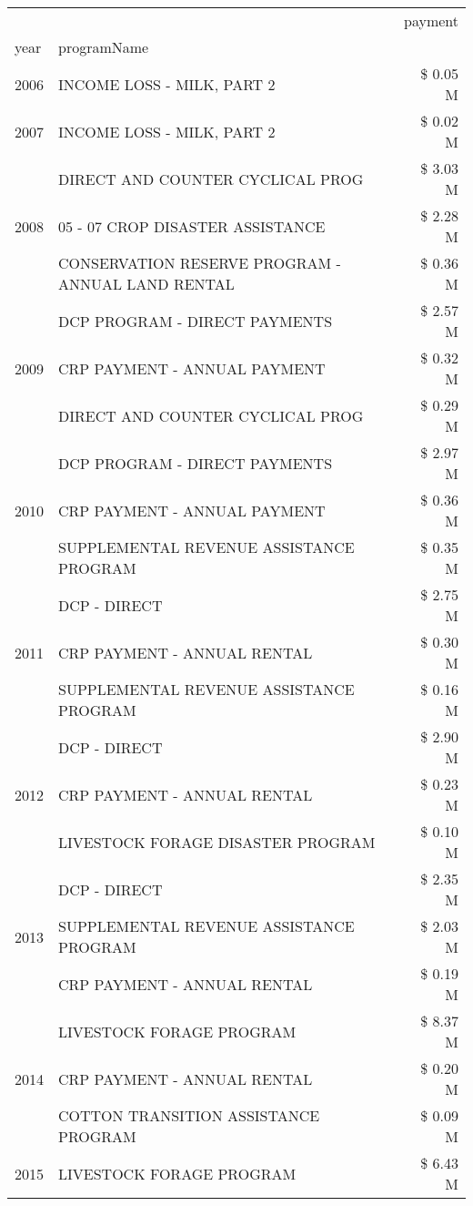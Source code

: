 \begin{tabular}{llr}
\toprule
 &  & payment \\
year & programName &  \\
\midrule
2006 & INCOME LOSS - MILK, PART 2 & \$ 0.05 M \\
\cline{1-3}
2007 & INCOME LOSS - MILK, PART 2 & \$ 0.02 M \\
\cline{1-3}
\multirow[t]{3}{*}{2008} & DIRECT AND COUNTER CYCLICAL PROG & \$ 3.03 M \\
 & 05 - 07 CROP DISASTER ASSISTANCE & \$ 2.28 M \\
 & CONSERVATION RESERVE PROGRAM - ANNUAL LAND RENTAL & \$ 0.36 M \\
\cline{1-3}
\multirow[t]{3}{*}{2009} & DCP PROGRAM - DIRECT PAYMENTS & \$ 2.57 M \\
 & CRP PAYMENT - ANNUAL PAYMENT & \$ 0.32 M \\
 & DIRECT AND COUNTER CYCLICAL PROG & \$ 0.29 M \\
\cline{1-3}
\multirow[t]{3}{*}{2010} & DCP PROGRAM - DIRECT PAYMENTS & \$ 2.97 M \\
 & CRP PAYMENT - ANNUAL PAYMENT & \$ 0.36 M \\
 & SUPPLEMENTAL REVENUE ASSISTANCE PROGRAM & \$ 0.35 M \\
\cline{1-3}
\multirow[t]{3}{*}{2011} & DCP - DIRECT & \$ 2.75 M \\
 & CRP PAYMENT - ANNUAL RENTAL & \$ 0.30 M \\
 & SUPPLEMENTAL REVENUE ASSISTANCE PROGRAM & \$ 0.16 M \\
\cline{1-3}
\multirow[t]{3}{*}{2012} & DCP - DIRECT & \$ 2.90 M \\
 & CRP PAYMENT - ANNUAL RENTAL & \$ 0.23 M \\
 & LIVESTOCK FORAGE DISASTER PROGRAM & \$ 0.10 M \\
\cline{1-3}
\multirow[t]{3}{*}{2013} & DCP - DIRECT & \$ 2.35 M \\
 & SUPPLEMENTAL REVENUE ASSISTANCE PROGRAM & \$ 2.03 M \\
 & CRP PAYMENT - ANNUAL RENTAL & \$ 0.19 M \\
\cline{1-3}
\multirow[t]{3}{*}{2014} & LIVESTOCK FORAGE PROGRAM & \$ 8.37 M \\
 & CRP PAYMENT - ANNUAL RENTAL & \$ 0.20 M \\
 & COTTON TRANSITION ASSISTANCE PROGRAM & \$ 0.09 M \\
\cline{1-3}
\multirow[t]{3}{*}{2015} & LIVESTOCK FORAGE PROGRAM & \$ 6.43 M \\

\end{tabular}
